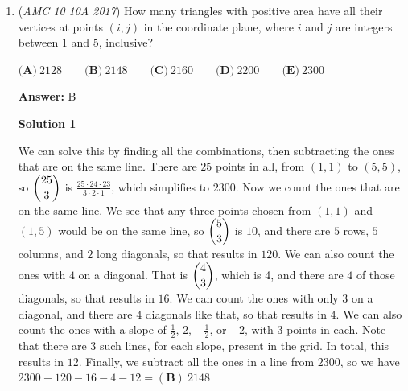 \begin{enumerate}
 We are nearly there. By 30-60-90 triangle, we know $DO = \frac{\sqrt{3}}{6}$, so the area of $\triangle BOC$ is $\frac{1\cdot\frac{\sqrt{3}}{6}}{2}=\frac{\sqrt{3}}{12}$. The area of the region inside both the triangle and circle is the area of the sector bounded by arc BC minus the area of $\triangle BOC$: $\frac{\pi}{9}-\frac{\sqrt{3}}{12}$. The area of the region outside of the circle but inside the triangle is $\frac{\sqrt{3}}{4}-\left(\frac{\pi}{9}-\frac{\sqrt{3}}{12}\right)=\frac{\sqrt{3}}{4}-\frac{\pi}{9}+\frac{\sqrt{3}}{12}=\frac{\sqrt{3}}{3}-\frac{\pi}{9}$ and the ratio is $\frac{\frac{\sqrt{3}}{3}-\frac{\pi}{9}}{\frac{\sqrt{3}}{4}}=\left(\frac{\sqrt{3}}{3}-\frac{\pi}{9}\right)\cdot\frac{4}{\sqrt{3}}=\frac{4\sqrt{3}}{3\sqrt{3}}-\frac{4\pi}{9\sqrt{3}}=\frac{4}{3}-\frac{4\sqrt{3}\pi}{27} \Longrightarrow \boxed{\textbf{(E) } \frac 43 - \frac{4\sqrt 3 \pi}{27}}$.

 


	\item (\textit{AMC 10 10A 2017}) How many triangles with positive area have all their vertices at points $(i,j)$ in the coordinate plane, where $i$ and $j$ are integers between $1$ and $5$, inclusive?


 $\textbf{(A)}\ 2128 \qquad\textbf{(B)}\ 2148 \qquad\textbf{(C)}\ 2160 \qquad\textbf{(D)}\ 2200 \qquad\textbf{(E)}\ 2300$

 \textbf{Answer: }B



\textbf{Solution 1}

We can solve this by finding all the combinations, then subtracting the ones that are on the same line. There are $25$ points in all, from $(1,1)$ to $(5,5)$, so $\dbinom{25}3$ is $\frac{25\cdot 24\cdot 23}{3\cdot 2 \cdot 1}$, which simplifies to $2300$. Now we count the ones that are on the same line. We see that any three points chosen from $(1,1)$ and $(1,5)$ would be on the same line, so $\dbinom53$ is $10$, and there are $5$ rows, $5$ columns, and $2$ long diagonals, so that results in $120$. We can also count the ones with $4$ on a diagonal. That is $\dbinom43$, which is 4, and there are $4$ of those diagonals, so that results in $16$. We can count the ones with only $3$ on a diagonal, and there are $4$ diagonals like that, so that results in $4$. We can also count the ones with a slope of $\frac12$, $2$, $-\frac12$, or $-2$, with $3$ points in each. Note that there are $3$ such lines, for each slope, present in the grid. In total, this results in $12$. Finally, we subtract all the ones in a line from $2300$, so we have $2300-120-16-4-12=\boxed{(\textbf{B})\ 2148}$





\end{enumerate}
